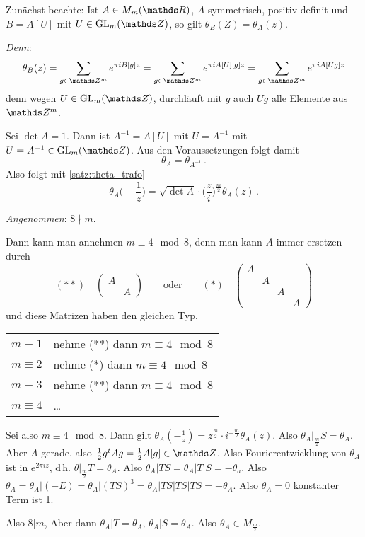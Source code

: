 \begin{bewe}
Zunächst beachte: Ist $A \in M_m(\RR)$, $A$ symmetrisch, positiv definit und $B = A[U]$ mit $U \in \GL_m(\ZZ)$, so gilt $\theta_B(Z) = \theta_A(z)$.

\emph{Denn}:
\[
    \theta_B(z)
    = \sum_{g \in \ZZ^m} e^{\pi iB[g]z}
    = \sum_{g \in \ZZ^m} e^{\pi i A[U][g]z}
    = \sum_{g \in \ZZ^m} e^{\pi i A[Ug]z}
\]
denn wegen $U\in\GL_m(\ZZ)$, durchläuft mit $g$ auch $Ug$ alle Elemente aus $\ZZ^m$.

Sei $\det A = 1$.
Dann ist $A^{-1} = A[U]$ mit $U = A^{-1}$ mit $U = A^{-1} \in \GL_m(\ZZ)$.
Aus den Voraussetzungen folgt damit
\[
    \theta_A = \theta_{A^{-1}}
    \,.
\]
Also folgt mit \autoref{satz:theta_trafo}
\[
    \theta_{A}\Big(-\frac{1}{z}\Big)
    = \sqrt{\det A} \cdot \Big(\frac{z}{i}\Big)^{\frac{m}{2}} \theta_A(z)
    \,.
\]

\emph{Angenommen}: $8 \nmid m$.

Dann kann man annehmen $m \equiv 4 \mod 8$, denn man kann $A$ immer ersetzen durch
\[
    (**)\quad \begin{pmatrix}A&\\&A\end{pmatrix} \qquad \text{oder} \qquad (*) \quad \begin{pmatrix}A\\&A\\&&A\\&&&A\end{pmatrix}
\]
und diese Matrizen haben den gleichen Typ.

\begin{tabular}{l l}
$m \equiv 1$ & nehme (**) dann $m \equiv 4 \mod 8$ \\
$m \equiv 2$ & nehme (*)\phantom{*} dann $m \equiv 4 \mod 8$ \\
$m \equiv 3$ & nehme (**) dann $m \equiv 4 \mod 8$ \\
$m \equiv 4$ & \ldots
\end{tabular}

Sei also $m \equiv 4 \mod 8$.
Dann gilt $\theta_A(-\frac{1}{z}) = z^{\frac{m}{2}} \cdot i^{-\frac{m}{2}} \theta_A(z)$.
Also $\theta_A|_{\frac{m}{2}}S = \theta_A$. Aber $A$ gerade, also $\frac{1}{2}g^tAg = \frac{1}{2}A[g] \in \ZZ$.
Also Fourierentwicklung von $\theta_A$ ist in $e^{2\pi iz}$, d\,h. $\theta|_{\frac{m}{2}}T = \theta_A$.
Also $\theta_A|TS = \theta_A|T|S = - \theta_a$.
Also $\theta_A = \theta_A|(-E) = \theta_A|(TS)^3 = \theta_A|TS|TS|TS = -\theta_A$.
Also $\theta_A = 0$ \blitz konstanter Term ist 1.

Also $8|m$, Aber dann $\theta_A|T = \theta_A$, $\theta_A|S = \theta_A$. Also $\theta_A \in M_{\frac{m}{2}}$.
\end{bewe}

